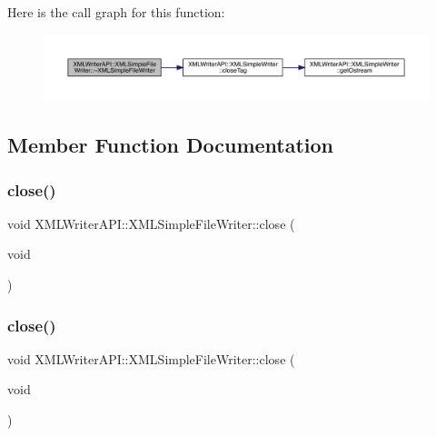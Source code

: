 Here is the call graph for this function\+:
\nopagebreak
\begin{figure}[H]
\begin{center}
\leavevmode
\includegraphics[width=350pt]{d2/de2/classXMLWriterAPI_1_1XMLSimpleFileWriter_a8a18cf3ea74f63a4f84a434237109e68_cgraph}
\end{center}
\end{figure}


\subsection{Member Function Documentation}
\mbox{\label{classXMLWriterAPI_1_1XMLSimpleFileWriter_a1ecf825fdd568364791b6d6a4de5ca74}} 
\subsubsection{\texorpdfstring{close()}{close()}\hspace{0.1cm}{\footnotesize\ttfamily [1/2]}}
{\footnotesize\ttfamily void X\+M\+L\+Writer\+A\+P\+I\+::\+X\+M\+L\+Simple\+File\+Writer\+::close (\begin{DoxyParamCaption}\item[{void}]{ }\end{DoxyParamCaption})\hspace{0.3cm}{\ttfamily [inline]}}

\mbox{\label{classXMLWriterAPI_1_1XMLSimpleFileWriter_a1ecf825fdd568364791b6d6a4de5ca74}} 
\subsubsection{\texorpdfstring{close()}{close()}\hspace{0.1cm}{\footnotesize\ttfamily [2/2]}}
{\footnotesize\ttfamily void X\+M\+L\+Writer\+A\+P\+I\+::\+X\+M\+L\+Simple\+File\+Writer\+::close (\begin{DoxyParamCaption}\item[{void}]{ }\end{DoxyParamCaption})\hspace{0.3cm}{\ttfamily [inline]}}



